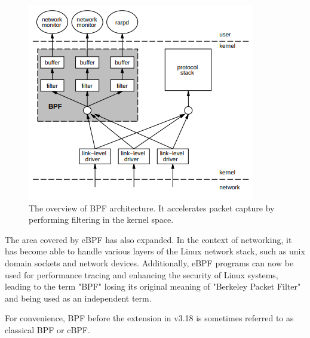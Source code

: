 \begin{figure}[tp]
  \begin{center}
    \includegraphics[width=\columnwidth]{./img/bpf_overview.png}
  \end{center}
  \caption{The overview of BPF architecture. It accelerates packet capture
    by performing filtering in the kernel space. \cite{mccanne1993bsd}}
  \label{img:bpf_old}
\end{figure}

The area covered by eBPF has also expanded.
In the context of networking, it has become able to handle various layers of the Linux network stack,
such as unix domain sockets and network devices.
Additionally, eBPF programs can now be used for performance tracing and enhancing the security of Linux systems,
leading to the term "BPF" losing its original meaning of "Berkeley Packet Filter" and being used as an independent term.

For convenience, BPF before the extension in v3.18 is sometimes referred to as classical BPF or cBPF.

